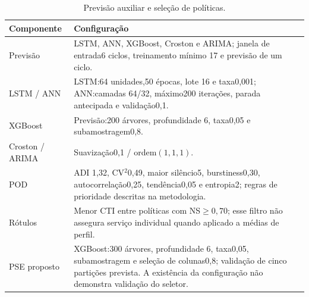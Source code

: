 \begin{table}[htbp]\centering\small
\caption{Previsão auxiliar e seleção de políticas.}\label{tab:forecast_label_params}
\begin{tabular}{@{}p{3cm}p{11.4cm}@{}}\toprule
\textbf{Componente} & \textbf{Configuração}\\\midrule
Previsão & LSTM, ANN, XGBoost, Croston e ARIMA; janela de entrada6 ciclos, treinamento mínimo 17 e previsão de um ciclo.\\
LSTM / ANN & LSTM:64 unidades,50 épocas, lote 16 e taxa0,001; ANN:camadas 64/32, máximo200 iterações, parada antecipada e validação0,1.\\
XGBoost & Previsão:200 árvores, profundidade 6, taxa0,05 e subamostragem0,8.\\
Croston / ARIMA & Suavização0,1 / ordem$(1,1,1)$.\\
POD & ADI 1,32, CV$^2$0,49, maior silêncio5, burstiness0,30, autocorrelação0,25, tendência0,05 e entropia2; regras de prioridade descritas na metodologia.\\
Rótulos & Menor CTI entre políticas com NS$\geq0,70$; esse filtro não assegura serviço individual quando aplicado a médias de perfil.\\
PSE proposto & XGBoost:300 árvores, profundidade 6, taxa0,05, subamostragem e seleção de colunas0,8; validação de cinco partições prevista. A existência da configuração não demonstra validação do seletor.\\
\bottomrule\end{tabular}\end{table}


